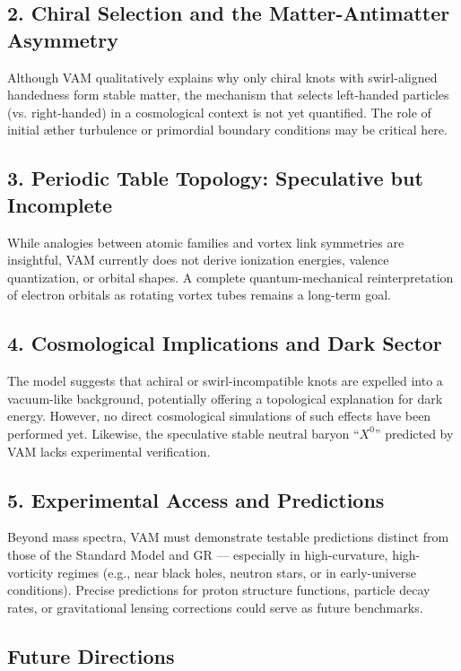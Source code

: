 \documentclass[a4paper,12pt]{article}
\begin{document}
\subsection*{2. Chiral Selection and the Matter-Antimatter Asymmetry}
Although VAM qualitatively explains why only chiral knots with swirl-aligned handedness form stable matter, the mechanism that selects left-handed particles (vs. right-handed) in a cosmological context is not yet quantified. The role of initial æther turbulence or primordial boundary conditions may be critical here.

\subsection*{3. Periodic Table Topology: Speculative but Incomplete}
While analogies between atomic families and vortex link symmetries are insightful, VAM currently does not derive ionization energies, valence quantization, or orbital shapes. A complete quantum-mechanical reinterpretation of electron orbitals as rotating vortex tubes remains a long-term goal.

\subsection*{4. Cosmological Implications and Dark Sector}
The model suggests that achiral or swirl-incompatible knots are expelled into a vacuum-like background, potentially offering a topological explanation for dark energy. However, no direct cosmological simulations of such effects have been performed yet. Likewise, the speculative stable neutral baryon “$X^0$” predicted by VAM lacks experimental verification.

\subsection*{5. Experimental Access and Predictions}
Beyond mass spectra, VAM must demonstrate testable predictions distinct from those of the Standard Model and GR — especially in high-curvature, high-vorticity regimes (e.g., near black holes, neutron stars, or in early-universe conditions). Precise predictions for proton structure functions, particle decay rates, or gravitational lensing corrections could serve as future benchmarks.

\subsection*{Future Directions}
\end{document}
